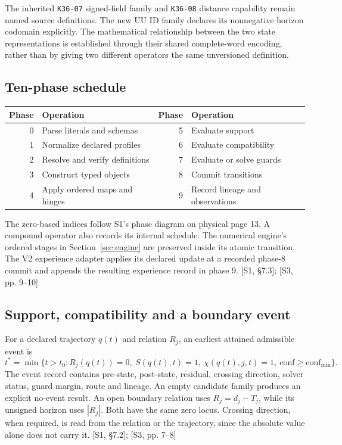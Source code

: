 \documentclass[11pt,a4paper]{article}
\numberwithin{equation}{section}
\newcommand{\src}[2]{{\sffamily\small\color{slate}[#1, #2]}}
\begin{document}
The inherited \texttt{K36-07} signed-field family and \texttt{K36-08} distance capability remain named source definitions. The new UU ID family declares its nonnegative horizon codomain explicitly. The mathematical relationship between the two state representations is established through their shared complete-word encoding, rather than by giving two different operators the same unversioned definition.

\subsection{Ten-phase schedule}
\begin{center}
\begin{tabular}{@{}rlrl@{}}
\toprule\textbf{Phase} & \textbf{Operation} & \textbf{Phase} & \textbf{Operation}\\\midrule
0 & Parse literals and schemas & 5 & Evaluate support\\
1 & Normalize declared profiles & 6 & Evaluate compatibility\\
2 & Resolve and verify definitions & 7 & Evaluate or solve guards\\
3 & Construct typed objects & 8 & Commit transitions\\
4 & Apply ordered maps and hinges & 9 & Record lineage and observations\\
\bottomrule
\end{tabular}
\end{center}
The zero-based indices follow S1's phase diagram on physical page 13. A compound operator also records its internal schedule. The numerical engine's ordered stages in Section~\ref{sec:engine} are preserved inside its atomic transition. The V2 experience adapter applies its declared update at a recorded phase-8 commit and appends the resulting experience record in phase 9. \src{S1}{\S7.3}; \src{S3}{pp. 9--10}

\subsection{Support, compatibility and a boundary event}
For a declared trajectory $q(t)$ and relation $R_j$, an earliest attained admissible event is
\begin{equation}
t^*=\min\{t>t_0:R_j(q(t))=0,\ S(q(t),t)=1,\ \chi(q(t),j,t)=1,\
\mathrm{conf}\ge\mathrm{conf}_{\min}\}.
\end{equation}
The event record contains pre-state, post-state, residual, crossing direction, solver status, guard margin, route and lineage. An empty candidate family produces an explicit no-event result. An open boundary relation uses $R_j=d_j-T_j$, while its unsigned horizon uses $|R_j|$. Both have the same zero locus. Crossing direction, when required, is read from the relation or the trajectory, since the absolute value alone does not carry it. \src{S1}{\S7.2}; \src{S3}{pp. 7--8}
\end{document}
